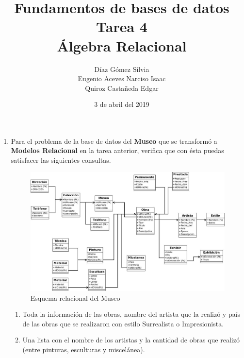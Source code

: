 \documentclass{article}
\begin{document}
    \title{
        Fundamentos de bases de datos \\
        Tarea 4 \\
        Álgebra Relacional
    }
    \author{
        Díaz Gómez Silvia \\
        Eugenio Aceves Narciso Isaac \\
        Quiroz Castañeda Edgar
    }
    \date {
        3 de abril del 2019    
    }
    \maketitle

    \begin{enumerate}
        \item {
            Para el problema de la base de datos del \textbf{Museo} que se
            transformó a \textbf{Modelos Relacional} en la tarea anterior,
            verifica que con ésta puedas satisfacer las siguientes consultas.
            \begin{figure}[H]
                \centering
                \includegraphics[scale=0.4]{img/museo.jpeg}
                \caption{Esquema relacional del Museo}
            \end{figure}
            \begin{enumerate}
                \item {
                    Toda la información de las obras, nombre del artista que la
                    realizó y país de las obras que se realizaron con estilo
                    Surrealista o Impresionista.
                }
                \item {
                    Una lista con el nombre de los artistas y la cantidad de
                    obras que realizó (entre pinturas, esculturas y miscelánea).
}
\end{enumerate}}
\end{enumerate}
\end{document}
